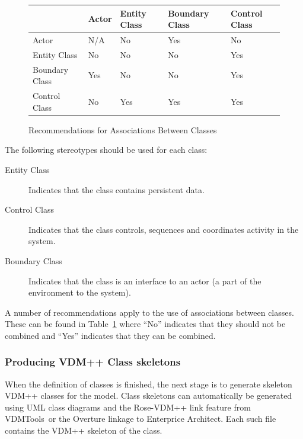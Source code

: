 \documentclass{overturerepchap}
\newcommand{\vdmtools}{VDMTools}
\begin{document}
\begin{figure}
\begin{center}
\begin{tabular}{|l|l|l|l|l|}\hline
         & Actor & Entity Class & Boundary Class &
           Control Class \\ \hline
Actor                        &   N/A  & No & Yes & No \\ \hline
Entity Class &  No    &No\footnotemark & No & Yes \\ \hline
Boundary Class& Yes   & No & No  & Yes \\ \hline
Control Class & No    &Yes & Yes & Yes \\ \hline
\end{tabular}
\end{center}
\caption{Recommendations for Associations Between Classes\label{tab:assoc}}
\end{figure}

The following stereotypes should be used for each class:
\begin{description}
\item[Entity Class] Indicates that the class contains
persistent data.
\item[Control Class] Indicates that the class controls, sequences and coordinates activity in the system.
\item[Boundary Class] Indicates that the class is an
interface to an actor (a part of the environment to the system).
\end{description}

A number of recommendations apply to the use of associations between
classes. These can be found in Table~\ref{tab:assoc} where ``No''
indicates that they should not be combined and ``Yes'' indicates that
they can be combined.

\subsubsection{Producing VDM++ Class skeletons}\label{subsub:skeleton}

When the definition of classes is finished, the next stage is to
generate skeleton VDM++ classes for the model. Class skeletons can
automatically be generated using UML class diagrams and the Rose-VDM++
link feature from \vdmtools\ or the Overture linkage to Enterprice Architect. 
Each such file contains the VDM++ skeleton of the class. 
\end{document}
